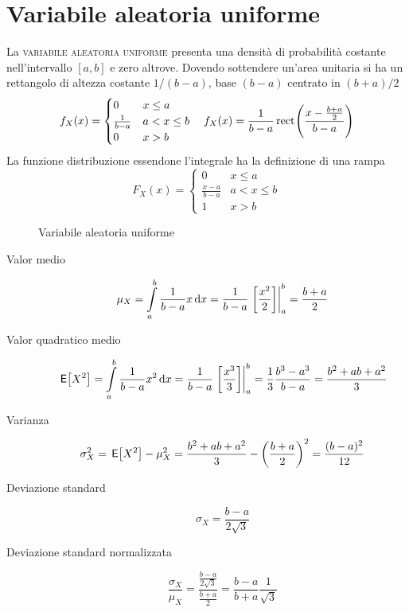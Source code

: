 \section{Variabile aleatoria uniforme}
La \textsc{variabile aleatoria uniforme} presenta una densità di probabilità costante nell'intervallo $[a,b]$ e zero altrove. Dovendo sottendere un'area unitaria si ha un rettangolo di altezza costante $1/(b-a)$, base $(b-a)$ centrato in $(b+a)/2$
\begin{equation}f_X(x)=\begin{cases}0&x\leq a\\ \frac{1}{b-a}&a<x\leq b\\0&x>b\end{cases}\quad f_X(x)=\frac{1}{b-a}\rect{\frac{x-\frac{b+a}{2}}{b-a}}\end{equation}
La funzione distribuzione essendone l'integrale ha la definizione di una rampa
\begin{equation}F_X(x)=\begin{cases}
0&x\leq a\\ \frac{x-a}{b-a}&a<x\leq b\\1&x>b
\end{cases}\end{equation}
\begin{figure}[!ht]
	\centering
	\qquad
	\caption{Variabile aleatoria uniforme}
\end{figure}

\begin{description}
\item[Valor medio]\[\mu_X=\intd{a}{b}{\frac{1}{b-a}x}{x}=\frac{1}{b-a}\bound{a}{b}{\frac{x^2}{2}}=\frac{b+a}{2}\]
\item[Valor quadratico medio] \[\E{X^2}=\intd{a}{b}{\frac{1}{b-a}x^2}{x}=\frac{1}{b-a}\bound{a}{b}{\frac{x^3}{3}}=\frac{1}{3}\frac{b^3-a^3}{b-a}=\frac{b^2+a b+a^2}{3}\]
\item[Varianza]\[\sigma^2_X=\E{X^2}-\mu^2_X=\frac{b^2+a b+a^2}{3}-\left(\frac{b+a}{2}\right)^2=\frac{(b-a)^2}{12}\]
\item[Deviazione standard]\[\sigma_X=\frac{b-a}{2\sqrt{3}}\]
\item[Deviazione standard normalizzata]\[\frac{\sigma_X}{\mu_X}=\frac{\frac{b-a}{2\sqrt{3}}}{\frac{b+a}{2}}=\frac{b-a}{b+a}\frac{1}{\sqrt{3}}\]
\end{description}

